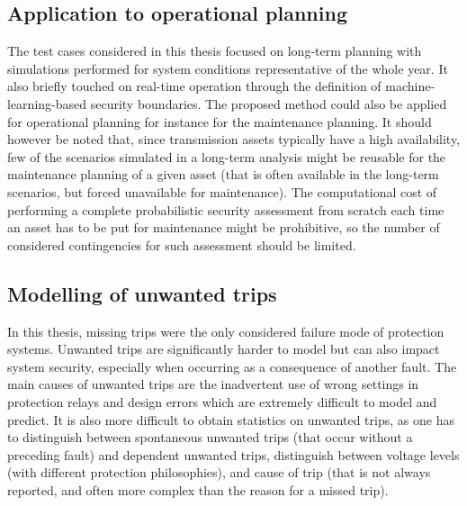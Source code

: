 
\subsection*{Application to operational planning}

The test cases considered in this thesis focused on long-term planning with simulations performed for system conditions representative of the whole year. It also briefly touched on real-time operation through the definition of machine-learning-based security boundaries. The proposed method could also be applied for operational planning for instance for the maintenance planning. It should however be noted that, since transmission assets typically have a high availability, few of the scenarios simulated in a long-term analysis might be reusable for the maintenance planning of a given asset (that is often available in the long-term scenarios, but forced unavailable for maintenance). The computational cost of performing a complete probabilistic security assessment from scratch each time an asset has to be put for maintenance might be prohibitive, so the number of considered contingencies for such assessment should be limited.

%
%

\subsection*{Modelling of unwanted trips}

In this thesis, missing trips were the only considered failure mode of protection systems. Unwanted trips are significantly harder to model but can also impact system security, especially when occurring as a consequence of another fault. The main causes of unwanted trips are the inadvertent use of wrong settings in protection relays and design errors which are extremely difficult to model and predict. It is also more difficult to obtain statistics on unwanted trips, as one has to distinguish between spontaneous unwanted trips (that occur without a preceding fault) and dependent unwanted trips, distinguish between voltage levels (with different protection philosophies), and cause of trip (that is not always reported, and often more complex than the reason for a missed trip).

